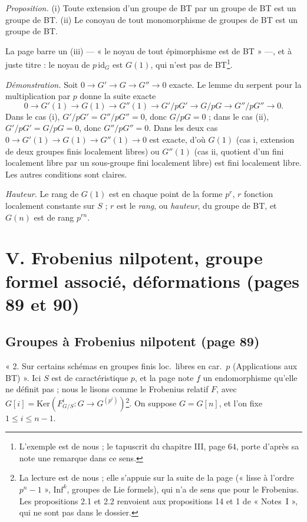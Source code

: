 \documentclass[11pt,a4paper]{article}
\begin{document}
\emph{Proposition.} (i) Toute extension d'un groupe de BT par un groupe
de BT est un groupe de BT. (ii) Le conoyau de tout monomorphisme de
groupes de BT est un groupe de BT.

La page barre un (iii) — « le noyau de tout épimorphisme est de BT » —,
et à juste titre : le noyau de $p\,\mathrm{id}_G$ est $G(1)$, qui n'est
pas de BT\footnote{L'exemple est de nous ; le tapuscrit du chapitre III,
page 64, porte d'après sa note une remarque dans ce sens.}.

\emph{Démonstration.} Soit $0 \to G' \to G \to G'' \to 0$ exacte. Le
lemme du serpent pour la multiplication par $p$ donne la suite exacte
\[
0 \to G'(1) \to G(1) \to G''(1) \to G'/pG' \to G/pG \to G''/pG'' \to 0 .
\]
Dans le cas (i), $G'/pG' = G''/pG'' = 0$, donc $G/pG = 0$ ; dans le cas
(ii), $G'/pG' = G/pG = 0$, donc $G''/pG'' = 0$. Dans les deux cas
$0 \to G'(1) \to G(1) \to G''(1) \to 0$ est exacte, d'où $G(1)$ (cas i,
extension de deux groupes finis localement libres) ou $G''(1)$ (cas ii,
quotient d'un fini localement libre par un sous-groupe fini localement
libre) est fini localement libre. Les autres conditions sont claires.

\emph{Hauteur.} Le rang de $G(1)$ est en chaque point de la forme $p^{r}$,
$r$ fonction localement constante sur $S$ ; $r$ est le \emph{rang}, ou
\emph{hauteur}, du groupe de BT, et $G(n)$ est de rang $p^{rn}$.

\section*{V. Frobenius nilpotent, groupe formel associé, déformations (pages 89 et 90)}

\subsection*{Groupes à Frobenius nilpotent (page 89)}

« 2. Sur certains schémas en groupes finis loc.\ libres en car.\ $p$
(Applications aux BT) ». Ici $S$ est de caractéristique $p$, et la page
note $\underline{f}$ un endomorphisme qu'elle ne définit pas ; nous le
lisons comme le Frobenius relatif $F$, avec
$G[i] = \mathrm{Ker}(F^{i}_{G/S} \colon G \to G^{(p^{i})})$\footnote{La
lecture est de nous ; elle s'appuie sur la suite de la page (« lisse à
l'ordre $p^{n} - 1$ », $\mathrm{Inf}^{k}$, groupes de Lie formels), qui
n'a de sens que pour le Frobenius. Les propositions 2.1 et 2.2 renvoient
aux propositions 14 et 1 de « Notes~I », qui ne sont pas dans le
dossier.}. On suppose $G = G[n]$, et l'on fixe $1 \leq i \leq n-1$.
\end{document}
